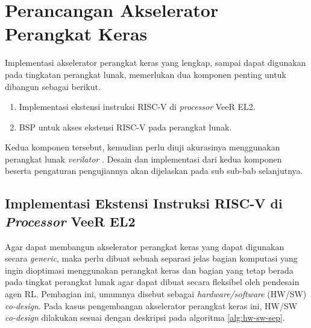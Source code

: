 \section{Perancangan Akselerator Perangkat Keras}
\label{sec:perancangan-akselerator}

Implementasi akselerator perangkat keras yang lengkap, sampai dapat digunakan pada tingkatan perangkat lunak, memerlukan dua komponen penting untuk dibangun sebagai berikut.

\begin{enumerate}
	\item Implementasi ekstensi instruksi RISC-V di \textit{processor} VeeR EL2.
	\item \ac{BSP} untuk akses ekstensi RISC-V pada perangkat lunak.
\end{enumerate}

Kedua komponen tersebut, kemudian perlu diuji akurasinya menggunakan perangkat lunak \textit{verilator} \parencite{verilator2024github}. Desain dan implementasi dari kedua komponen beserta pengaturan pengujiannya akan dijelaskan pada sub sub-bab selanjutnya.

\subsection{Implementasi Ekstensi Instruksi RISC-V di \textit{Processor} VeeR EL2}

Agar dapat membangun akselerator perangkat keras yang dapat digunakan secara \textit{generic}, maka perlu dibuat sebuah separasi jelas bagian komputasi yang ingin dioptimasi menggunakan perangkat keras dan bagian yang tetap berada pada tingkat perangkat lunak agar dapat dibuat secara fleksibel oleh pendesain agen \ac{RL}. Pembagian ini, umumnya disebut sebagai \textit{hardware/software} (HW/SW) \textit{co-design}. Pada kasus pengembangan akselerator perangkat keras ini, HW/SW \textit{co-design} dilakukan sesuai dengan deskripsi pada algoritma \ref{alg:hw-sw-sep}.

